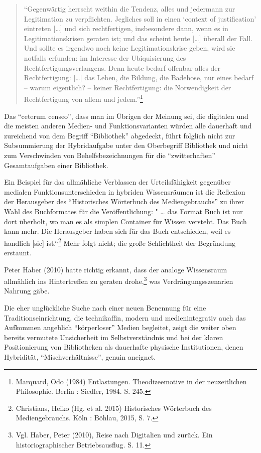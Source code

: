 \documentclass[a4paper,
fontsize=11pt,
oneside,
numbers=noperiodatend,
parskip=half-,
bibliography=totoc,
final
]{scrartcl}
\begin{document}
\begin{quote}
\enquote{Gegenwärtig herrscht weithin die Tendenz, alles und jedermann
zur Legitimation zu verpflichten. Jegliches soll in einen
\enquote{context of justification} eintreten {[}\ldots{}{]} und sich
rechtfertigen, insbesondere dann, wenn es in Legitimationskrisen geraten
ist; und das scheint heute {[}\ldots{}{]} überall der Fall. Und sollte
es irgendwo noch keine Legitimationskrise geben, wird sie notfalls
erfunden: im Interesse der Ubiquisierung des Rechtfertigungsverlangens.
Denn heute bedarf offenbar alles der Rechtfertigung: {[}\ldots{}{]} das
Leben, die Bildung, die Badehose, nur eines bedarf -- warum eigentlich?
-- keiner Rechtfertigung: die Notwendigkeit der Rechtfertigung von allem
und jedem.}\footnote{Marquard, Odo (1984) Entlastungen. Theodizeemotive
  in der neuzeitlichen Philosophie. Berlin : Siedler, 1984. S. 245.}
\end{quote}

Das \enquote{ceterum censeo}, dass man im Übrigen der Meinung sei, die
digitalen und die meisten anderen Medien- und Funktionsvarianten würden
alle dauerhaft und zureichend von dem Begriff \enquote{Bibliothek}
abgedeckt, führt folglich nicht zur Subsummierung der Hybridaufgabe
unter den Oberbegriff Bibliothek und nicht zum Verschwinden von
Behelfsbezeichnungen für die \enquote{zwitterhaften} Gesamtaufgaben
einer Bibliothek.

Ein Beispiel für das allmähliche Verblassen der Urteilsfähigkeit
gegenüber medialen Funktionsunterschieden in hybriden Wissensräumen ist
die Reflexion der Herausgeber des \enquote{Historisches Wörterbuch des
Mediengebrauchs} zu ihrer Wahl des Buchformates für die
Veröffentlichung: " \ldots{} das Format Buch ist nur dort überholt, wo
man es als simplen Container für Wissen versteht. Das Buch kann mehr.
Die Herausgeber haben sich für das Buch entschieden, weil es handlich
{[}sic{]} ist.``\footnote{Christians, Heiko (Hg. et al. 2015)
  Historisches Wörterbuch des Mediengebrauchs. Köln : Böhlau, 2015, S.
  7.} Mehr folgt nicht; die große Schlichtheit der Begründung erstaunt.

Peter Haber (2010) hatte richtig erkannt, dass der analoge Wissensraum
allmählich ins Hintertreffen zu geraten drohe,\footnote{Vgl. Haber,
  Peter (2010), Reise nach Digitalien und zurück. Ein
  historiographischer Betriebsausflug. S. 11.} was Verdrängungsszenarien
Nahrung gäbe.

Die eher unglückliche Suche nach einer neuen Benennung für eine
Traditionseinrichtung, die technikaffin, modern und medienintegrativ
auch das Aufkommen angeblich \enquote{körperloser} Medien begleitet,
zeigt die weiter oben bereits vermutete Unsicherheit im
Selbstverständnis und bei der klaren Positionierung von Bibliotheken als
dauerhafte physische Institutionen, denen Hybridität,
\enquote{Mischverhältnisse}, genuin aneignet.
\end{document}
